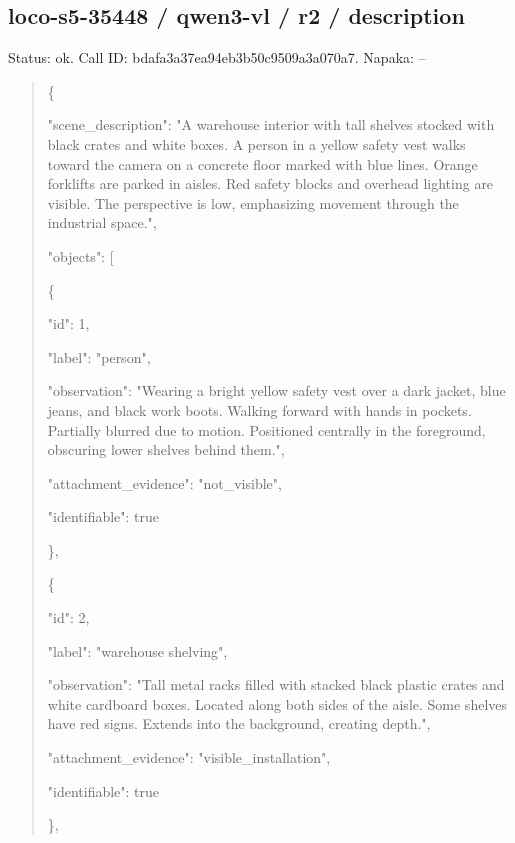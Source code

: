 \documentclass[10pt,a4paper]{article}
\begin{document}
\subsection*{loco-s5-35448 / qwen3-vl / r2 / description}
Status: ok. Call ID: bdafa3a37ea94eb3b50c9509a3a070a7. Napaka: --
\begin{quote}\footnotesize
\{\par
  "scene\_description":\allowbreak{} "A warehouse interior with tall shelves stocked with black crates and white boxes. A person in a yellow safety vest walks toward the camera on a concrete floor marked with blue lines. Orange forklifts are parked in aisles. Red safety blocks and overhead lighting are visible. The perspective is low,\allowbreak{} emphasizing movement through the industrial space.",\allowbreak{}\par
  "objects":\allowbreak{} [\par
    \{\par
      "id":\allowbreak{} 1,\allowbreak{}\par
      "label":\allowbreak{} "person",\allowbreak{}\par
      "observation":\allowbreak{} "Wearing a bright yellow safety vest over a dark jacket,\allowbreak{} blue jeans,\allowbreak{} and black work boots. Walking forward with hands in pockets. Partially blurred due to motion. Positioned centrally in the foreground,\allowbreak{} obscuring lower shelves behind them.",\allowbreak{}\par
      "attachment\_evidence":\allowbreak{} "not\_visible",\allowbreak{}\par
      "identifiable":\allowbreak{} true\par
    \},\allowbreak{}\par
    \{\par
      "id":\allowbreak{} 2,\allowbreak{}\par
      "label":\allowbreak{} "warehouse shelving",\allowbreak{}\par
      "observation":\allowbreak{} "Tall metal racks filled with stacked black plastic crates and white cardboard boxes. Located along both sides of the aisle. Some shelves have red signs. Extends into the background,\allowbreak{} creating depth.",\allowbreak{}\par
      "attachment\_evidence":\allowbreak{} "visible\_installation",\allowbreak{}\par
      "identifiable":\allowbreak{} true\par
    \},\allowbreak{}\par

\end{quote}
\end{document}
